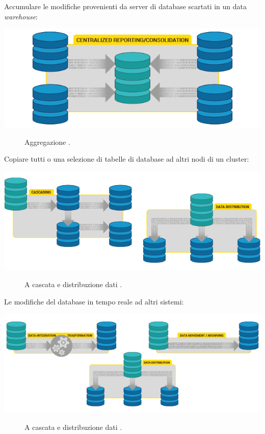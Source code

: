 Accumulare le modifiche provenienti da server di database scartati in un data \textit{warehouse}:

\begin{center}
\includegraphics[scale=0.60]{img/pglogical_2.png}\\
\end{center}
\begin{figure}[htbp]
\caption{Aggregazione \cite{etichetta3}.}
\label{fig:pglogical_2}
\end{figure}

Copiare tutti o una selezione di tabelle di database ad altri nodi di un cluster:

\begin{center}
\includegraphics[scale=0.60]{img/pglogical_3.png}\\
\end{center}
\begin{figure}[htbp]
\caption{A cascata e distribuzione dati \cite{etichetta3}.}
\label{fig:pglogical_3}
\end{figure}

Le modifiche del database in tempo reale ad altri sistemi:

\begin{center}
\includegraphics[scale=0.60]{img/pglogical_4.png}\\
\end{center}
\begin{figure}[htbp]
\caption{A cascata e distribuzione dati \cite{etichetta3}.}
\label{fig:pglogical_4}
\end{figure}


